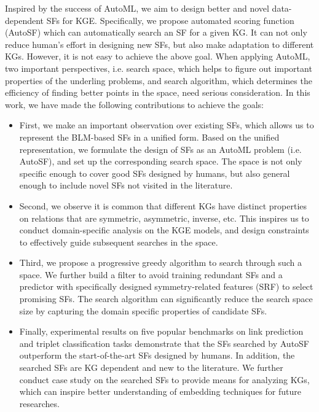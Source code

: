 \documentclass[conference]{IEEEtran}
\begin{document}
Inspired by the success of AutoML,
we aim to design better and novel data-dependent SFs for KGE.
Specifically,
we propose automated scoring function (AutoSF)
which can automatically search an SF for a given KG.
It can not only reduce human's effort in designing new SFs,
but also make adaptation to different KGs.
However,
it is not easy to achieve the above goal.
When applying AutoML,
two important perspectives,
i.e. search space, which helps to figure out important properties of the underling problems,
and search algorithm, which determines the efficiency of finding better points in the space,
need serious consideration.
In this work,
we have made the following contributions to achieve the goals:
\begin{itemize}[leftmargin = 10px,itemsep=1px]
\item 
First,
we make an important observation over existing SFs,
which allows us to represent the BLM-based SFs in a unified form.
Based on the unified representation,
we formulate the design of SFs as an AutoML problem (i.e. AutoSF),
and set up the corresponding search space.
The space is not only specific enough
to cover good SFs designed by humans,
but also general enough to include 
novel SFs not visited in the literature.

\item 
Second, we observe it is common that different KGs have distinct properties
on relations
that are
symmetric, asymmetric, inverse, etc.
This inspires us to conduct domain-specific analysis on the KGE models,
and design constraints 
to effectively guide subsequent searches in the space.

\item 
Third, 
we propose a progressive greedy algorithm to search through such a space.
We further build a filter to avoid training redundant SFs
and a predictor with specifically designed symmetry-related features (SRF) to select promising SFs.
The search algorithm can significantly reduce the search space size
by capturing the domain specific properties of candidate SFs.

\item
Finally, experimental results on five popular benchmarks on link prediction and triplet classification tasks
demonstrate that the SFs searched by AutoSF
outperform the start-of-the-art SFs
designed by humans.
In addition,
the searched SFs
are KG dependent and new to the literature.
We further conduct case study on the searched SFs 
to provide means for analyzing KGs,
which can inspire better understanding of embedding techniques for future researches.
\end{itemize}
\end{document}
